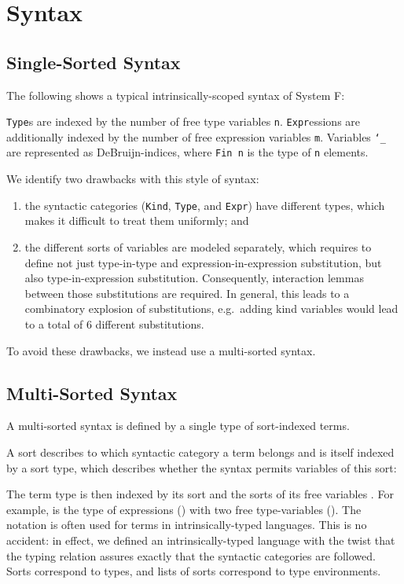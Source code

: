 \documentclass[sigplan,10pt]{acmart}
\newenvironment{LibCode*}{%
  \begin{tcolorbox}[%
    colframe=white,%
    boxrule=0.0pt,%
    top=2.5pt,%
    left=2.5pt,%
    bottom=2.5pt,%
    right=2.5pt,%
    boxsep=0pt%
  ]\vspace{-0.2\baselineskip}%
}{%
  \vspace{-1\baselineskip}%
  \end{tcolorbox}%
}
\newenvironment{ExampleCode*}{%
  \begin{tcolorbox}[%
    colframe=white,%
    colback=yellow!5,%
    boxrule=0.0pt,%
    top=2.5pt,%
    left=2.5pt,%
    bottom=2.5pt,%
    right=2.5pt,%
    boxsep=0pt%
  ]\vspace{-0.2\baselineskip}%
}{%
  \vspace{-1\baselineskip}%
  \end{tcolorbox}%
}
\newcommand*\LibCode[1]{\begin{LibCode*}{#1}\end{LibCode*}}
\newcommand*\AppCode[1]{{#1}}
\newcommand*\ExampleCode[1]{\begin{ExampleCode*}{#1}\end{ExampleCode*}}
\newcommand*\ACode[1]{\AgdaFontStyle{\textcolor{mygray}{#1}}}
\newcommand*\ACon[1]{\AgdaInductiveConstructor{#1}}
\begin{document}
  \newpage

  \section{Syntax}
  \subsection{Single-Sorted Syntax}
  The following shows a typical intrinsically-scoped syntax of System F:
  \ExampleCode\FUnsortedSyntax

  \texttt{Type}s are indexed by the number of free type variables \texttt{n}.
  \texttt{Expr}essions are additionally indexed by the number of free expression variables \texttt{m}.
  Variables \texttt{`\_} are represented as DeBruijn-indices, where \texttt{Fin n} is the type of \texttt{n} elements.

  We identify two drawbacks with this style of syntax:
  \begin{enumerate}
  \item the syntactic categories (\texttt{Kind}, \texttt{Type}, and \texttt{Expr})
    have different types, which makes it difficult to treat them uniformly; and
  \item the different sorts of variables are modeled separately, which requires to define not just
    type-in-type and expression-in-expression substitution, but also type-in-expression substitution.
    Consequently, interaction lemmas between those substitutions are required.
    In general, this leads to a combinatory explosion of
    substitutions, e.g.\ adding kind variables would lead to a total of 6
    different substitutions.
  \end{enumerate}
  To avoid these drawbacks, we instead use a multi-sorted syntax.

  \subsection{Multi-Sorted Syntax}
  A multi-sorted syntax is defined by a single type of sort-indexed terms.

  A sort describes to which syntactic category a term belongs and is
  itself indexed by a sort type, which describes whether the syntax
  permits variables of this sort:
  \LibCode\KSortTy
  \AppCode\FSort
  
  The term type \ACode{S \ACon{⊢} s} is then indexed by its sort
  \ACode{s} and the sorts of its free variables \ACode{S}.
  For example, \ACode{\ACon{[𝕥, 𝕥] ⊢ 𝕖}} is the type of expressions
  (\ACode{\ACon{𝕖}}) with two free type-variables (\ACode{\ACon{𝕥}}).
  \newpage
  \AppCode\FSyntax
  The notation \ACode{\ACon{\_⊢\_}} is often used for terms in
  intrinsically-typed languages. This is no accident: in effect, we
  defined an intrinsically-typed language with the twist that the
  typing relation assures exactly that the syntactic categories are followed.
  Sorts \ACode{s} correspond to types, and lists of sorts \ACode{S}
  correspond to type environments.
\end{document}
